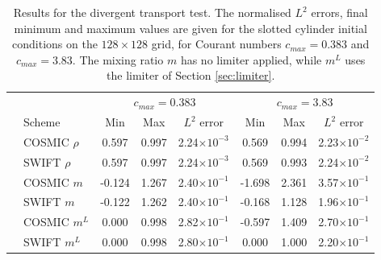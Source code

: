 \documentclass[11pt,a4paper]{article}
\begin{document}
\begin{table}[h!]
\small
\begin{center}
\begin{tabular}{| c | l | c c c | c c c |} \hline
  &  & \multicolumn{3}{c|}{$c_{max}=0.383$} & \multicolumn{3}{c|}{$c_{max}=3.83$} \\
  & Scheme &  Min & Max & $L^2$ error & Min & Max & $L^2$ error   \\ \hline
  \parbox[t]{2mm}{}
  & COSMIC $\rho$ & 0.597 & 0.997 & 2.24$\times 10^{-3}$ & 0.569 & 0.994 & 2.23$\times 10^{-2}$ \\
  & SWIFT $\rho$ & 0.597 & 0.997 & 2.24$\times 10^{-3}$ & 0.569 & 0.993 & 2.24$\times 10^{-2}$ \\
  & COSMIC $m$ & -0.124 & 1.267 & 2.40$\times 10^{-1}$ & -1.698 & 2.361 & 3.57$\times 10^{-1}$ \\
  & SWIFT $m$ & -0.122 & 1.262 & 2.40$\times 10^{-1}$ & -0.168 & 1.128 & 1.96$\times 10^{-1}$ \\
  & COSMIC $m^L$ & 0.000 & 0.998 & 2.82$\times 10^{-1}$ & -0.597 & 1.409 & 2.70$\times 10^{-1}$ \\
  & SWIFT $m^L$ & 0.000 & 0.998 & 2.80$\times 10^{-1}$ & 0.000 & 1.000 & 2.20$\times 10^{-1}$ \\ \hline
\end{tabular}
\caption{Results for the divergent transport test. The normalised $L^2$ errors, final minimum and maximum values are given for the slotted cylinder initial conditions on the $128\times128$ grid, for Courant numbers $c_{max}=0.383$ and $c_{max}=3.83$.
The mixing ratio $m$ has no limiter applied, while $m^L$ uses the limiter of Section \ref{sec:limiter}.}
\label{table:test3}
\end{center}
\end{table}
\end{document}
